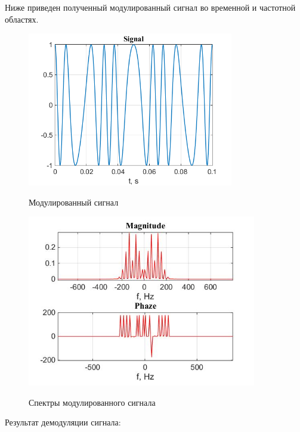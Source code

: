 \documentclass[a4paper,14pt]{article}
\begin{document}
\newpage
Ниже приведен полученный модулированный сигнал во временной и частотной областях.


\begin{figure}[h]
\begin{multicols}{1}
\hfill
\includegraphics[width=90mm]{ph}
\hfill
\caption{Модулированный сигнал}
\label{figBottom}
\hfill
\includegraphics[width=100mm]{ph_spec}
\hfill
\caption{Спектры модулированного сигнала}
\label{figDown}
\end{multicols}
\end{figure}


Результат демодуляции сигнала:
\end{document}

